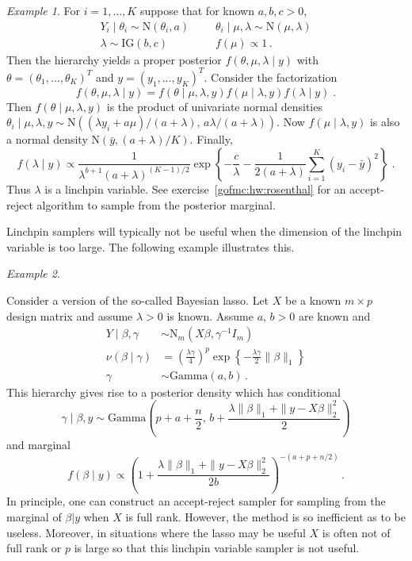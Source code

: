 \documentclass[12pt]{article}
\theoremstyle{plain}
\theoremstyle{definition}
\theoremstyle{remark}
\newtheorem{example}{Example}[section]
\begin{document}
\begin{example} \label{gofmc:ex:rosenthal}
For $i=1,\ldots, K$ suppose that for known $a, b, c > 0$,
\begin{align*}
Y_i \mid \theta_i  \sim  \text{N}(\theta_i, a) ~~&~~~~~ \theta_i \mid \mu, \lambda \sim  \text{N}(\mu, \lambda)\\
\lambda  \sim \text{IG}(b, c) ~~&~~~~~  f(\mu)  \propto 1 \, .
\end{align*}
Then the hierarchy yields a proper posterior $f(\theta, \mu, \lambda \mid
y)$ with $\theta=(\theta_1, \ldots, \theta_K)^T$ and $y=(y_1, \ldots,
y_K)^T$.  Consider the factorization \cite[see][]{jone:hara:caff:neat:2006} 
$$
f(\theta, \mu, \lambda \mid y) = f(\theta \mid \mu, \lambda, y) f(\mu \mid
\lambda, y) f(\lambda \mid y) \; . 
$$
Then $f(\theta \mid \mu, \lambda, y)$ is the product of univariate normal
densities $\theta_i \mid \mu, \lambda, y \sim \text{N}((\lambda y_i +
a\mu)/(a+\lambda), \, a\lambda / (a + \lambda))$.  Now $f(\mu \mid
\lambda, y)$ is also a normal density $\text{N}(\bar{y},
(a+\lambda)/K)$. Finally, 
$$
f(\lambda \mid y) \propto \frac{1}{\lambda^{b+1} (a + \lambda)^{(K-1)/2}}
\exp\left\{ - \frac{c}{\lambda} - \frac{1}{2(a+\lambda)}
  \sum_{i=1}^{K} (y_i - \bar{y})^{2}\right\} \; . 
$$
Thus $\lambda$ is a linchpin variable. See
exercise~\ref{gofmc:hw:rosenthal} for an accept-reject algorithm to
sample from the posterior marginal.   
\end{example}

Linchpin samplers will typically not be useful when the dimension of
the linchpin variable is too large.  The following example illustrates
this.

\begin{example}
  \label{gofmc:ex:Bayesian lasso}
  
  Consider a version of the so-called Bayesian lasso. Let $X$ be a
  known $m \times p$ design matrix and assume $\lambda > 0$ is known.
  Assume $a, \, b >0$ are known and
\begin{align*}
Y\mid \beta, \gamma & \sim \text{N}_{m}(X\beta, \gamma^{-1}I_{m}) \\
\nu(\beta\mid \gamma) & = \left(\frac{\lambda \gamma}{4}\right)^{p}
                    \exp\left\{ -\frac{\lambda \gamma}{2}
                    \|\beta\|_{1}\right\}\\ 
\gamma & \sim \text{Gamma}(a,b) \, .
\end{align*}
This hierarchy gives rise to a posterior density which has conditional 
$$
\gamma \mid \beta, y \sim \text{Gamma} \left(p + a + \frac{n}{2}, \, b +
  \frac{\lambda \|\beta\|_{1} + \|y- X\beta \|_{2}^{2}}{2}\right) 
$$
and marginal
$$
f(\beta \mid y) \propto \left(1 + \frac{\lambda \|\beta\|_{1} + \|y-
    X\beta \|_{2}^{2}}{2b}\right)^{-(a + p + n/2)} \, . 
$$
In principle, one can construct an accept-reject sampler for sampling
from the marginal of $\beta|y$ when $X$ is full rank.  However, the
method is so inefficient as to be useless.  Moreover, in situations
where the lasso may be useful $X$ is often not of full rank or $p$ is
large so that this linchpin variable sampler is not useful.
\end{example}
\end{document}
